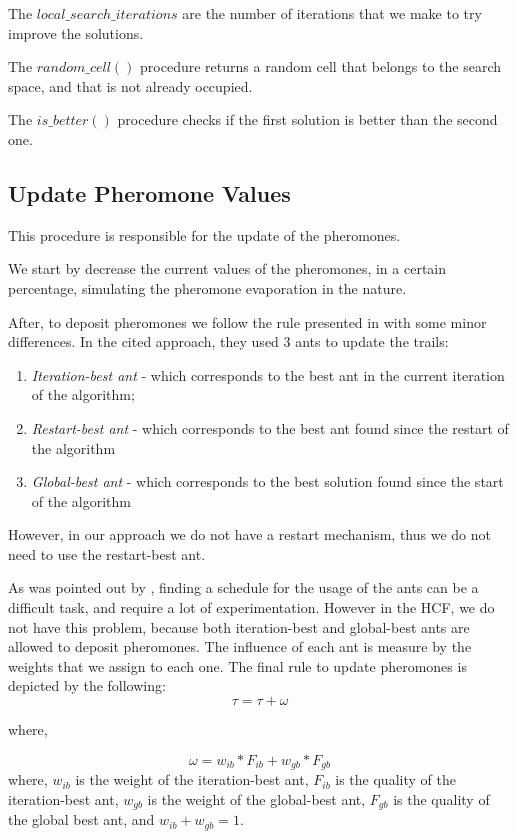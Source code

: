 			The $local\_search\_iterations$ are the number of iterations that we make to try improve the solutions.

			The $random\_cell()$ procedure returns a random cell that belongs to the search space, and that is not already occupied.

			The $is\_better()$ procedure checks if the first solution is better than the second one.
			\subsection{Update Pheromone Values}
			This procedure is responsible for the update of the pheromones. 

			We start by decrease the current values of the pheromones, in a certain percentage, simulating the pheromone evaporation in the nature.

			After, to deposit pheromones we follow the rule presented in \cite{blum04} with some minor differences. In the cited approach, they used 3 ants to update the trails:
			\begin{enumerate}
				\item \emph{Iteration-best ant} - which corresponds to the best ant in the current iteration of the algorithm;
				\item \emph{Restart-best ant} - which corresponds to the best ant found since the restart of the algorithm
				\item \emph{Global-best ant} - which corresponds to the best solution found since the start of the algorithm
			\end{enumerate}
			
			However, in our approach we do not have a restart mechanism, thus we do not need to use the restart-best ant. 

			As was pointed out by \cite{blum04}, finding a schedule for the usage of the ants can be a difficult task, and require a lot of experimentation. However in the HCF, we do not have this problem, because both iteration-best and global-best ants are allowed to deposit pheromones. The influence of each ant is measure by the weights that we assign to each one. The final rule to update pheromones is depicted by the following:
			\begin{equation}
				\tau = \tau + \omega
			\end{equation}
			
			where,
			
			\begin{equation}
				\omega = w_{ib} * F_{ib} + w_{gb} * F_{gb}
			\end{equation}
			where, $w_{ib}$ is the weight of the iteration-best ant, $F_{ib}$ is the quality of the iteration-best ant, $w_{gb}$ is the weight of the global-best ant, $F_{gb}$ is the quality of the global best ant, and $w_{ib} + w_{gb} = 1$.
			
